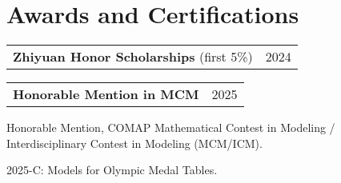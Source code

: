 \documentclass[letterpaper,11pt]{article}
\makeatletter
\newcommand{\cvitem}[1]{
  \item\small{
    {#1\vspace{-2pt}}
  }
}
\newcommand{\twopartheader}[2]{
  \vspace{-2pt}\noindent
  \begin{tabular*}{\textwidth}{l@{\extracolsep{\fill}}r}
    #1 & #2 \\
  \end{tabular*}\vspace{-7pt}
}
\newcommand{\cvheadingstart}{\begin{itemize}[leftmargin=0in, label={}]}
\newcommand{\cvheadingend}{\end{itemize}}
\newcommand{\cvitemstart}{\begin{itemize}[label=\textopenbullet]\justifying}
\newcommand{\cvitemend}{\end{itemize}\vspace{-5pt}}
\makeatother
\begin{document}



\section{Awards and Certifications}



\twopartheader{\textbf{Zhiyuan Honor Scholarships} (first 5\%)}{2024}
\newline

\twopartheader{\textbf{Honorable Mention in MCM}}{2025}


Honorable Mention, COMAP Mathematical Contest in Modeling / Interdisciplinary Contest in Modeling (MCM/ICM).


2025-C: Models for Olympic Medal Tables.

\end{document}
